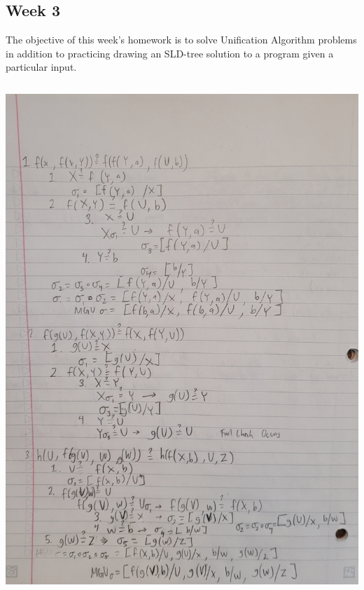 \documentclass{article}
\theoremstyle{theorem}
\theoremstyle{definition}
\theoremstyle{remark}
\begin{document}
\subsection{Week 3}
The objective of this week's homework is to solve Unification Algorithm problems in addition to practicing drawing an SLD-tree solution to a program given a particular input.
\\ \includegraphics[width=18cm, height=20cm]{Report Images/HW3_1.jpg}
\end{document}
